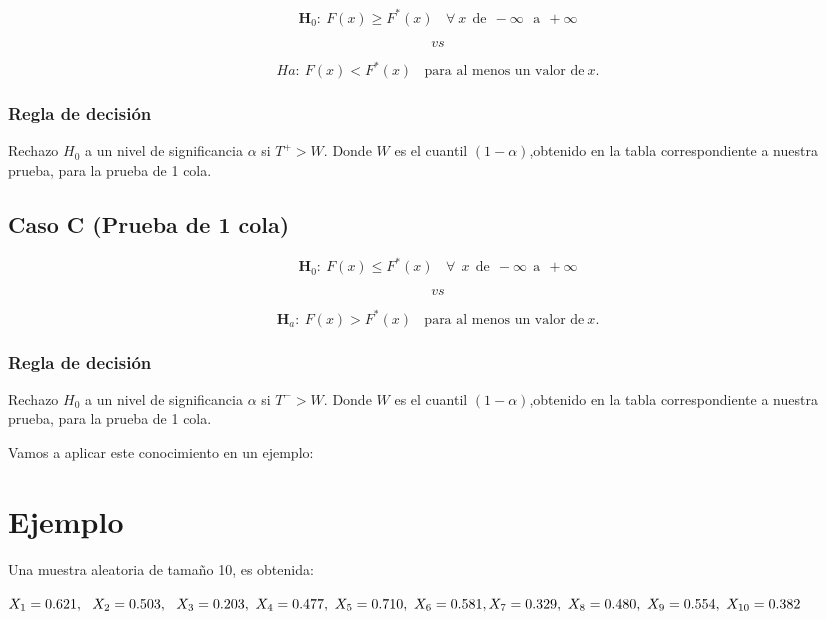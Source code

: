 \documentclass[
  a4paper,
  oneside,
  openany]{book}
\begin{document}
\[\textbf{H}_0: \ F(x) \geq F^*(x) \ \ \ \ \forall\ x\ \ \mbox{de} \ \ -\infty \  \ \  \mbox{a} \ \ +\infty\]

\[vs\]

\[Ha: \ F(x) < F^*(x) \ \ \ \ \mbox{para al menos un valor de} \  x.\]

\hypertarget{regla-de-decisiuxf3n-29}{%
\subsubsection*{Regla de decisión}\label{regla-de-decisiuxf3n-29}}


Rechazo \(H_0\) a un nivel de significancia \(\alpha\) si \(T^+>W\). Donde \(W\) es el cuantil \((1-\alpha)\),obtenido en la tabla correspondiente a nuestra prueba, para la prueba de 1 cola.

\hypertarget{caso-c-prueba-de-1-cola-1}{%
\subsection*{Caso C (Prueba de 1 cola)}\label{caso-c-prueba-de-1-cola-1}}


\[\textbf{H}_0:\ F(x) \leq F^*(x) \ \ \ \ \forall \ \ x \ \  \mbox{de} \  \ -\infty \ \  \mbox{a} \ \  +\infty\]

\[vs\]

\[\textbf{H}_a: \ F(x) > F^*(x) \ \ \ \ \mbox{para al menos un valor de} \  x.\]

\hypertarget{regla-de-decisiuxf3n-30}{%
\subsubsection*{Regla de decisión}\label{regla-de-decisiuxf3n-30}}


Rechazo \(H_0\) a un nivel de significancia \(\alpha\) si \(T^->W\). Donde \(W\) es el cuantil \((1-\alpha)\),obtenido en la tabla correspondiente a nuestra prueba, para la prueba de 1 cola.

Vamos a aplicar este conocimiento en un ejemplo:

\hypertarget{ejemplo-13}{%
\section{Ejemplo}\label{ejemplo-13}}

Una muestra aleatoria de tamaño 10, es obtenida:

\(X_{1}=0.621,\ \ X_{2}=0.503, \ \ X_{3}=0.203, \ X_{4}=0.477, \ X_{5}=0.710, \ X_{6}=0.581, \\ X_{7}=0.329, \ X_{8}=0.480, \  X_{9}=0.554, \ X_{10}=0.382\)
\end{document}
